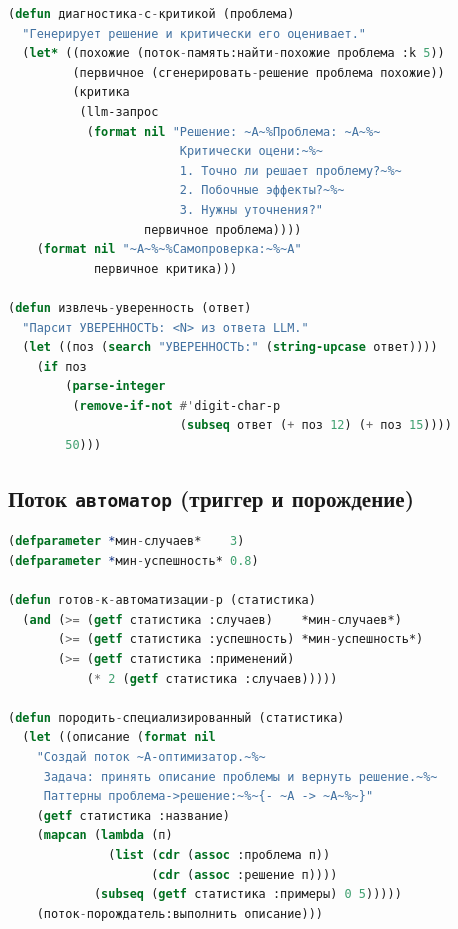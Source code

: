 \documentclass[12pt, a4paper, twoside]{article}
\begin{document}
\begin{lstlisting}[language=CommonLisp,caption={Двухэтапная диагностика с self-critique}]
(defun диагностика-с-критикой (проблема)
  "Генерирует решение и критически его оценивает."
  (let* ((похожие (поток-память:найти-похожие проблема :k 5))
         (первичное (сгенерировать-решение проблема похожие))
         (критика
          (llm-запрос
           (format nil "Решение: ~A~%Проблема: ~A~%~
                        Критически оцени:~%~
                        1. Точно ли решает проблему?~%~
                        2. Побочные эффекты?~%~
                        3. Нужны уточнения?"
                   первичное проблема))))
    (format nil "~A~%~%Самопроверка:~%~A"
            первичное критика)))

(defun извлечь-уверенность (ответ)
  "Парсит УВЕРЕННОСТЬ: <N> из ответа LLM."
  (let ((поз (search "УВЕРЕННОСТЬ:" (string-upcase ответ))))
    (if поз
        (parse-integer
         (remove-if-not #'digit-char-p
                        (subseq ответ (+ поз 12) (+ поз 15))))
        50)))
\end{lstlisting}

\subsection{Поток \texttt{автоматор} (триггер и порождение)}

\begin{lstlisting}[language=CommonLisp,caption={Анализ готовности паттерна к автоматизации}]
(defparameter *мин-случаев*    3)
(defparameter *мин-успешность* 0.8)

(defun готов-к-автоматизации-p (статистика)
  (and (>= (getf статистика :случаев)    *мин-случаев*)
       (>= (getf статистика :успешность) *мин-успешность*)
       (>= (getf статистика :применений)
           (* 2 (getf статистика :случаев)))))

(defun породить-специализированный (статистика)
  (let ((описание (format nil
    "Создай поток ~A-оптимизатор.~%~
     Задача: принять описание проблемы и вернуть решение.~%~
     Паттерны проблема->решение:~%~{- ~A -> ~A~%~}"
    (getf статистика :название)
    (mapcan (lambda (п)
              (list (cdr (assoc :проблема п))
                    (cdr (assoc :решение п))))
            (subseq (getf статистика :примеры) 0 5)))))
    (поток-порождатель:выполнить описание)))
\end{lstlisting}

\end{document}
